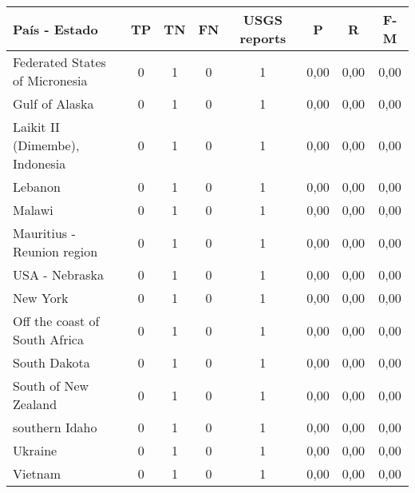 {\small
\begin{table}[!ht]
\centering
  \begin{tabular}{|l|ccc|c|ccc|}
  \hline
  País - Estado & TP & TN & FN & USGS reports & P & R & F-M \\
  \hline \hline
Federated States of Micronesia	 & 0   	 & 1 	 & 0   	& 1	 & 0,00 &	0,00 &	0,00 \\ \hline
Gulf of Alaska	 & 0   	 & 1 	 & 0   	& 1	 & 0,00 &	0,00 &	0,00 \\ \hline
Laikit II (Dimembe), Indonesia	 & 0   	 & 1 	 & 0   	& 1	 & 0,00 &	0,00 &	0,00 \\ \hline
Lebanon	 & 0   	 & 1 	 & 0   	& 1	 & 0,00 &	0,00 &	0,00 \\ \hline
Malawi	 & 0   	 & 1 	 & 0   	& 1	 & 0,00 &	0,00 &	0,00 \\ \hline
Mauritius - Reunion region	 & 0   	 & 1 	 & 0   	& 1	 & 0,00 &	0,00 &	0,00 \\ \hline
USA - Nebraska	 & 0   	 & 1 	 & 0   	& 1	 & 0,00 &	0,00 &	0,00 \\ \hline
New York	 & 0   	 & 1 	 & 0   	& 1	 & 0,00 &	0,00 &	0,00 \\ \hline
Off the coast of South Africa	 & 0   	 & 1 	 & 0   	& 1	 & 0,00 &	0,00 &	0,00 \\ \hline
South Dakota	 & 0   	 & 1 	 & 0   	& 1	 & 0,00 &	0,00 &	0,00 \\ \hline
South of New Zealand	 & 0   	 & 1 	 & 0   	& 1	 & 0,00 &	0,00 &	0,00 \\ \hline
southern Idaho	 & 0   	 & 1 	 & 0   	& 1	 & 0,00 &	0,00 &	0,00 \\ \hline
Ukraine	 & 0   	 & 1 	 & 0   	& 1	 & 0,00 &	0,00 &	0,00 \\ \hline
Vietnam	 & 0   	 & 1 	 & 0   	& 1	 & 0,00 &	0,00 &	0,00 \\ \hline
   \end{tabular}
\end{table}}
